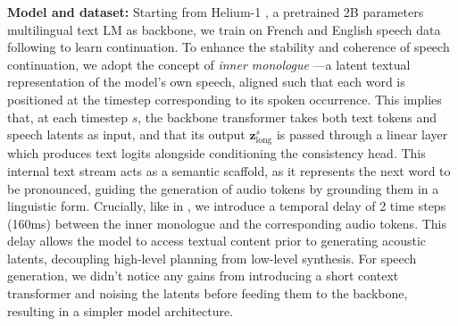 \noindent\textbf{Model and dataset:} Starting from Helium-1 \citep{kyutai2025helium}, a pretrained 2B parameters multilingual text LM as backbone, we train on French and English speech data following \citet{moshi} to learn continuation. To enhance the stability and coherence of speech continuation, we adopt the concept of \textit{inner monologue} \citep{moshi}—a latent textual representation of the model’s own speech, aligned such that each word is positioned at the timestep corresponding to its spoken occurrence. This implies that, at each timestep $s$, the backbone transformer takes both text tokens and speech latents as input, and that its output $\mathbf{z}^s_\text{long}$ is passed through a linear layer which produces text logits alongside conditioning the consistency head. This internal text stream acts as a semantic scaffold, as it represents the next word to be pronounced, guiding the generation of audio tokens by grounding them in a linguistic form. Crucially, like in \citet{moshi}, we introduce a temporal delay of 2 time steps (160ms) between the inner monologue and the corresponding audio tokens. This delay allows the model to access textual content prior to generating acoustic latents, decoupling high-level planning from low-level synthesis.
For speech generation, we didn't notice any gains from introducing a short context transformer and noising the latents before feeding them to the backbone, resulting in a simpler model architecture.
\begin{table}[h]
\caption{\textbf{Comparison of speech continuation models}: 8-RVQ RQ-transformer vs 1-step Consistency model head, with 2 temperature options.}
\centering
{}
\label{tab:speech_evals}
\end{table}

